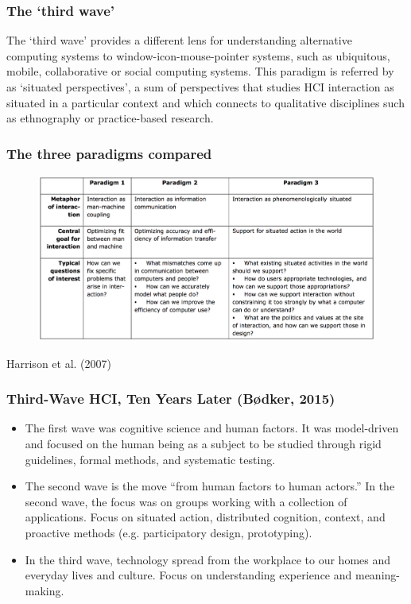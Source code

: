 \documentclass[screen, aspectratio=169]{beamer}
\begin{document}
%
\begin{frame}
\frametitle{The `third wave'}
The `third wave' provides a different lens for understanding alternative computing systems to window-icon-mouse-pointer systems, such as ubiquitous, mobile, collaborative or social computing systems. This paradigm is referred by~\cite{Harrison.et.al.2007.three} as `situated perspectives', a sum of perspectives that studies HCI interaction as situated in a particular context and which connects to qualitative disciplines such as ethnography or practice-based research.
\end{frame}
%
\begin{frame}
\frametitle{The three paradigms compared}
\begin{figure}
\includegraphics[scale=0.18]{img/the-three-HCI-paradigms.png}
\end{figure}
{\scriptsize Harrison et al. (2007) \cite{Harrison.et.al.2007.three}}
\end{frame}
%
\begin{frame}
\frametitle{Third-Wave HCI, Ten Years Later (B{\o}dker, 2015)}
{\small
\begin{itemize}
\item The first wave was cognitive science and human factors. It was model-driven and focused on the human being as a subject to be studied through rigid guidelines, formal methods, and systematic testing. \cite{Bodker.2015.third}
\item The second wave is the move ``from human factors to human actors.'' In the second wave, the focus was on groups working with a collection of applications. Focus on situated action, distributed cognition, context, and proactive methods (e.g. participatory design, prototyping). \cite{Bodker.2015.third}
\item  In the third wave, technology spread from the workplace to our homes and everyday lives and culture. Focus on understanding experience and meaning-making. \cite{Bodker.2015.third}
\end{itemize}
}
\end{frame}
\end{document}
